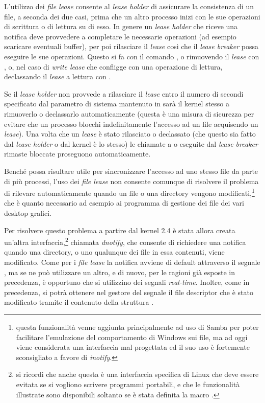 L'utilizzo dei \textit{file lease} consente al \textit{lease holder} di
assicurare la consistenza di un file, a seconda dei due casi, prima che un
altro processo inizi con le sue operazioni di scrittura o di lettura su di
esso. In genere un \textit{lease holder} che riceve una notifica deve
provvedere a completare le necessarie operazioni (ad esempio scaricare
eventuali buffer), per poi rilasciare il \textit{lease} così che il
\textit{lease breaker} possa eseguire le sue operazioni. Questo si fa con il
comando , o rimuovendo il \textit{lease} con
, o, nel caso di \textit{write lease} che confligge con una
operazione di lettura, declassando il \textit{lease} a lettura con
.

Se il \textit{lease holder} non provvede a rilasciare il \textit{lease} entro
il numero di secondi specificato dal parametro di sistema mantenuto in
 sarà il kernel stesso a rimuoverlo o
declassarlo automaticamente (questa è una misura di sicurezza per evitare che
un processo blocchi indefinitamente l'accesso ad un file acquisendo un
\textit{lease}). Una volta che un \textit{lease} è stato rilasciato o
declassato (che questo sia fatto dal \textit{lease holder} o dal kernel è lo
stesso) le chiamate a  o  eseguite dal \textit{lease
  breaker} rimaste bloccate proseguono automaticamente.

Benché possa risultare utile per sincronizzare l'accesso ad uno stesso file da
parte di più processi, l'uso dei \textit{file lease} non consente comunque di
risolvere il problema di rilevare automaticamente quando un file o una
directory vengono modificati,\footnote{questa funzionalità venne aggiunta
  principalmente ad uso di Samba per poter facilitare l'emulazione del
  comportamento di Windows sui file, ma ad oggi viene considerata una
  interfaccia mal progettata ed il suo uso è fortemente sconsigliato a favore
  di \textit{inotify}.} che è quanto necessario ad esempio ai programma di
gestione dei file dei vari desktop grafici.


Per risolvere questo problema a partire dal kernel 2.4 è stata allora creata
un'altra interfaccia,\footnote{si ricordi che anche questa è una interfaccia
  specifica di Linux che deve essere evitata se si vogliono scrivere programmi
  portabili, e che le funzionalità illustrate sono disponibili soltanto se è
  stata definita la macro .} chiamata \textit{dnotify},
che consente di richiedere una notifica quando una directory, o uno qualunque
dei file in essa contenuti, viene modificato.  Come per i \textit{file lease}
la notifica avviene di default attraverso il segnale , ma se ne
può utilizzare un altro, e di nuovo, per le ragioni già esposte in precedenza,
è opportuno che si utilizzino dei segnali \textit{real-time}.  Inoltre, come
in precedenza, si potrà ottenere nel gestore del segnale il file descriptor
che è stato modificato tramite il contenuto della struttura
.

